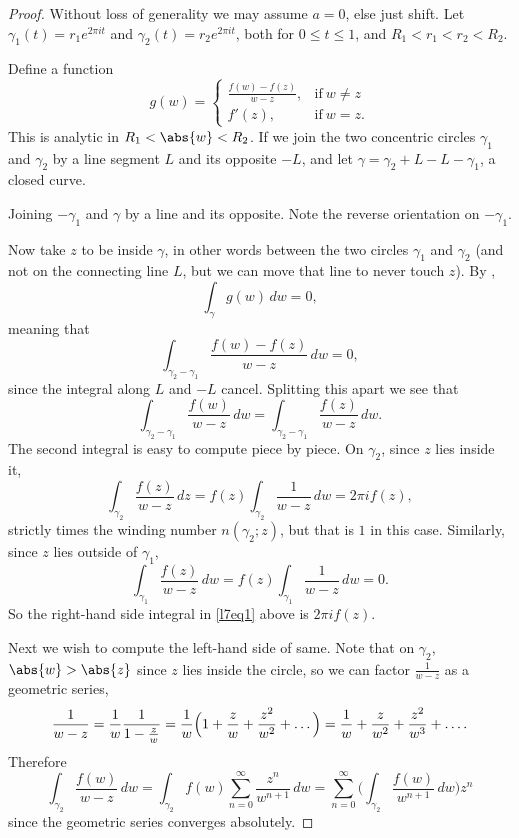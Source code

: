 \begin{proof}
	Without loss of generality we may assume $a = 0$, else just shift.
	Let $\gamma_1(t) = r_1 e^{2 \pi i t}$ and $\gamma_2(t) = r_2 e^{2 \pi i t}$, both for $0 \leq t \leq 1$, and $R_1 < r_1 < r_2 < R_2$.

	Define a function
	\[
		g(w) = \begin{cases}
			\frac{f(w) - f(z)}{w - z}, & \text{if}~ w \neq z \\
			f'(z), & \text{if}~ w = z.
		\end{cases}
	\]
	This is analytic in $R_1 < \abs{w} < R_2$.
	If we join the two concentric circles $\gamma_1$ and $\gamma_2$ by a line segment $L$ and its opposite $-L$, and let $\gamma = \gamma_2 + L - L - \gamma_1$, a closed curve.

	\begin{marginfigure}
		\caption{\label{thm53:fig} Joining $-\gamma_1$ and $\gamma$ by a line and its opposite.
		Note the reverse orientation on $-\gamma_1$.}
	\end{marginfigure}

	Now take $z$ to be inside $\gamma$, in other words between the two circles $\gamma_1$ and $\gamma_2$ (and not on the connecting line $L$, but we can move that line to never touch $z$).
	By ,
	\[
		\int_\gamma g(w) \, d w = 0,
	\]
	meaning that
	\[
		\int_{\gamma_2 - \gamma_1} \frac{f(w) - f(z)}{w - z} \, d w = 0,
	\]
	since the integral along $L$ and $-L$ cancel.
	Splitting this apart we see that
	\begin{equation}\label{l7eq1}
		\int_{\gamma_2 - \gamma_1} \frac{f(w)}{w - z} \, d w = \int_{\gamma_2 -\gamma_1} \frac{f(z)}{w - z} \, d w.
	\end{equation}
	The second integral is easy to compute piece by piece.
	On $\gamma_2$, since $z$ lies inside it,
	\[
		\int_{\gamma_2} \frac{f(z)}{w - z} \, d z = f(z) \int_{\gamma_2} \frac{1}{w - z} \, d w = 2 \pi i f(z),
	\]
	strictly times the winding number $n(\gamma_2; z)$, but that is $1$ in this case.
	Similarly, since $z$ lies outside of $\gamma_1$,
	\[
		\int_{\gamma_1} \frac{f(z)}{w - z} \, d w = f(z) \int_{\gamma_1} \frac{1}{w - z} \, d w = 0.
	\]
	So the right-hand side integral in \autoref{l7eq1} above is $2 \pi i f(z)$.

	Next we wish to compute the left-hand side of same.
	Note that on $\gamma_2$, $\abs{w} > \abs{z}$ since $z$ lies inside the circle, so we can factor $\frac{1}{w - z}$ as a geometric series,
	\[
		\frac{1}{w - z} = \frac{1}{w} \frac{1}{1 -\frac{z}{w}} = \frac{1}{w} \Bigl ( 1 + \frac{z}{w} + \frac{z^2}{w^2} + \dots \Bigr ) = \frac{1}{w} + \frac{z}{w^2} + \frac{z^2}{w^3} + \dots.
	\]
	Therefore
	\[
		\int_{\gamma_2} \frac{f(w)}{w - z} \, d w = \int_{\gamma_2} f(w) \sum_{n = 0}^\infty \frac{z^n}{w^{n + 1}} \, d w = \sum_{n = 0}^\infty \biggl ( \int_{\gamma_2} \frac{f(w)}{w^{n + 1}} \, d w \biggr ) z^n
	\]
	since the geometric series converges absolutely.


\end{proof}
